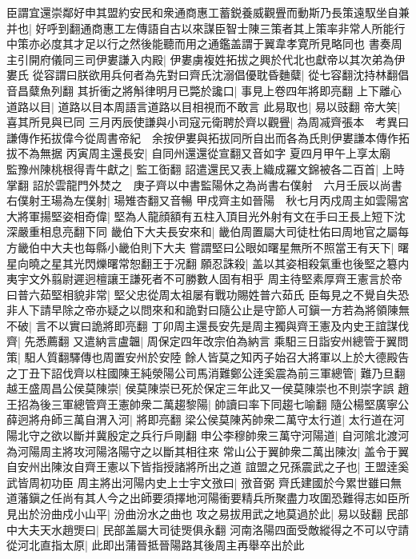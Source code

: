 臣謂宜還崇鄰好申其盟約安民和衆通商惠工蓄鋭養威觀舋而動斯乃長策遠馭坐自兼并也|{
	好呼到翻通商惠工左傳語自古以來謀臣智士陳三策者其上策率非常人所能行中策亦必度其才足以行之然後能聽而用之通鑑盖謂于翼韋孝寛所見略同也}
書奏周主引開府儀同三司伊婁謙入内殿|{
	伊婁虜複姓拓拔之興於代北也獻帝以其次弟為伊婁氏}
從容謂曰朕欲用兵何者為先對曰齊氏沈溺倡優耽昏麯糵|{
	從七容翻沈持林翻倡音昌糵魚列翻}
其折衝之將斛律明月已斃於讒口|{
	事見上卷四年將即亮翻}
上下離心道路以目|{
	道路以目本周語言道路以目相視而不敢言}
此易取也|{
	易以豉翻}
帝大笑|{
	喜其所見與已同}
三月丙辰使謙與小司寇元衛聘於齊以觀舋|{
	為周㓕齊張本　考異曰謙傳作拓拔偉今從周書帝紀　余按伊婁與拓拔同所自出而各為氏則伊婁謙本傳作拓拔不為無据}
丙寅周主還長安|{
	自同州還還從宣翻又音如字}
夏四月甲午上享太廟　監豫州陳桃根得青牛獻之|{
	監工衘翻}
詔遣還民又表上織成羅文錦被各二百首|{
	上時掌翻}
詔於雲龍門外焚之　庚子齊以中書監陽休之為尚書右僕射　六月壬辰以尚書右僕射王瑒為左僕射|{
	瑒雉杏翻又音暢}
甲戍齊主如晉陽　秋七月丙戍周主如雲陽宮大將軍揚堅姿相奇偉|{
	堅為人龍顔額有五柱入頂目光外射有文在手曰王長上短下沈深嚴重相息亮翻下同}
畿伯下大夫長安來和|{
	畿伯周置屬大司徒杜佑曰周地官之屬每方畿伯中大夫也每縣小畿伯則下大夫}
嘗謂堅曰公眼如曙星無所不照當王有天下|{
	曙星向曉之星其光閃爍曙常恕翻王于况翻}
願忍誅殺|{
	盖以其姿相殺氣重也後堅之簒内夷宇文外翦尉遲迥檀讓王謙死者不可勝數人固有相乎}
周主待堅素厚齊王憲言於帝曰普六茹堅相貌非常|{
	堅父忠從周太祖屡有戰功賜姓普六茹氏}
臣每見之不覺自失恐非人下請早除之帝亦疑之以問來和和詭對曰隨公止是守節人可鎭一方若為將領陳無不破|{
	言不以實曰詭將即亮翻}
丁卯周主還長安先是周主獨與齊王憲及内史王誼謀伐齊|{
	先悉薦翻}
又遣納言盧韞|{
	周保定四年改宗伯為納言}
乘馹三日詣安州總管于翼問策|{
	馹人質翻驛傳也周置安州於安陸}
餘人皆莫之知丙子始召大將軍以上於大德殿告之丁丑下詔伐齊以柱國陳王純滎陽公司馬消難鄭公逹奚震為前三軍總管|{
	難乃旦翻}
越王盛周昌公侯莫陳崇|{
	侯莫陳崇已死於保定三年此又一侯莫陳崇也不則崇字誤}
趙王招為後三軍總管齊王憲帥衆二萬趨黎陽|{
	帥讀曰率下同趨七喻翻}
隨公楊堅廣寧公薛迥將舟師三萬自渭入河|{
	將即亮翻}
梁公侯莫陳芮帥衆二萬守太行道|{
	太行道在河陽北守之欲以斷并冀殷定之兵行戶剛翻}
申公李穆帥衆三萬守河陽道|{
	自河隂北渡河為河陽周主將攻河陽洛陽守之以斷其相往來}
常山公于翼帥衆二萬出陳汝|{
	盖令于翼自安州出陳汝自齊王憲以下皆指授諸將所出之道}
誼盟之兄孫震武之子也|{
	王盟逹奚武皆周初功臣}
周主將出河陽内史上士宇文㢸曰|{
	㢸音弼}
齊氏建國於今累世雖曰無道藩鎭之任尚有其人今之出師要須擇地河陽衝要精兵所聚盡力攻圍恐難得志如臣所見出於汾曲戍小山平|{
	汾曲汾水之曲也}
攻之易拔用武之地莫過於此|{
	易以䜴翻}
民部中大夫天水趙煚曰|{
	民部盖屬大司徒煚俱永翻}
河南洛陽四面受敵縱得之不可以守請從河北直指太原|{
	此即出蒲晉抵晉陽路其後周主再舉卒出於此}
